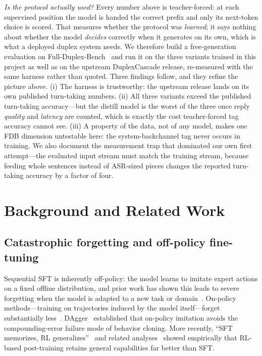 \documentclass[conference]{IEEEtran}
\begin{document}
\emph{Is the protocol actually used?} Every number above is teacher-forced: at each
supervised position the model is handed the correct prefix and only its next-token
choice is scored. That measures whether the protocol was \emph{learned}; it says
nothing about whether the model \emph{decides} correctly when it generates on its own,
which is what a deployed duplex system needs. We therefore build a free-generation
evaluation on Full-Duplex-Bench~\cite{lin2025fdb} and run it on the three variants
trained in this project as well as on the upstream DuplexCascade release,
re-measured with the same harness rather than quoted. Three findings follow, and they
refine the picture above. (i) The harness is trustworthy: the upstream release lands
on its own published turn-taking numbers. (ii) All three variants exceed the published
turn-taking accuracy---but the distill model is the worst of the three once reply
\emph{quality} and \emph{latency} are counted, which is exactly the cost teacher-forced
tag accuracy cannot see. (iii) A property of the data, not of any model, makes one
FDB dimension untestable here: the system-backchannel tag never occurs in training.
We also document the measurement trap that dominated our own first attempt---the
evaluated input stream must match the training stream, because feeding whole sentences
instead of ASR-sized pieces changes the reported turn-taking accuracy by a factor of
four.

\section{Background and Related Work}
\subsection{Catastrophic forgetting and off-policy fine-tuning}
Sequential SFT is inherently off-policy: the model learns to imitate expert actions
on a fixed offline distribution, and prior work has shown this leads to severe
forgetting when the model is adapted to a new task or domain~\cite{kirkpatrick2017,
lifhoiem2017,mecklenburg2024}. On-policy methods---training on trajectories induced
by the model itself---forget substantially less~\cite{ross2011,airef,chu2025,
rlsrazor2025}. DAgger~\cite{ross2011} established that on-policy imitation avoids the
compounding-error failure mode of behavior cloning. More recently,
``SFT memorizes, RL generalizes''~\cite{chu2025} and related analyses~\cite{airef}
showed empirically that RL-based post-training retains general capabilities far
better than SFT.
\end{document}
